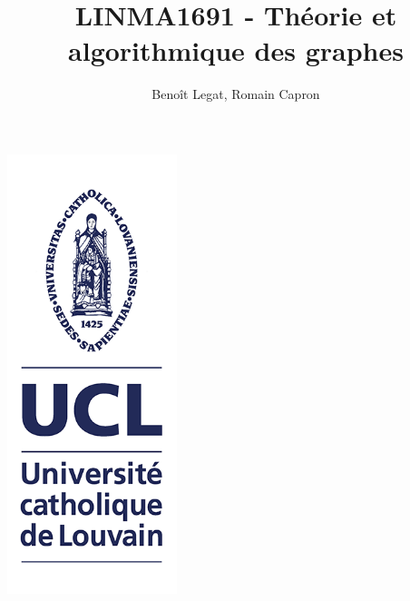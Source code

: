 

\title{LINMA1691 - Théorie et algorithmique des graphes}
\author{Beno\^it Legat, Romain Capron}



\maketitle
\begin{center}
\includegraphics[width=140pt]{./img/logo}
\end{center}
\newpage

\tableofcontents
\newpage















